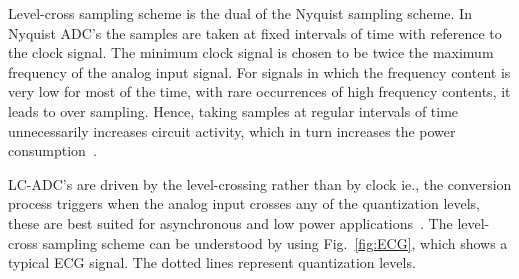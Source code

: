 \begin{table}[t]
	\caption{Difference Between Nyquist \& Level Cross Sampling Schemes}
	\label{tab:DNL}
	\begin{center}
	\end{center}
\end{table}

\par
\hspace{0.6cm} Level-cross sampling scheme is the dual of the Nyquist sampling scheme. In Nyquist \mbox{ADC's} the samples are taken at fixed intervals of time with reference to the clock signal. The minimum clock signal is chosen to be twice the maximum frequency of the analog input signal. For signals in which the frequency content is very low for most of the time, with rare occurrences of high frequency contents, it leads to over sampling. Hence, taking samples at regular intervals of time unnecessarily increases circuit activity, which in turn increases the power consumption~\cite{sayiner1996level}.

\par
\hspace{0.6cm} 	\mbox{LC-ADC's} are driven by the level-crossing rather than by clock ie., the conversion process triggers when the analog input crosses any of the quantization levels, these are best suited for asynchronous and low power applications~\cite{allier2003new}. The level-cross sampling scheme can be understood by using Fig.~\ref{fig:ECG}, which shows a typical ECG signal. The dotted lines represent quantization levels. 


